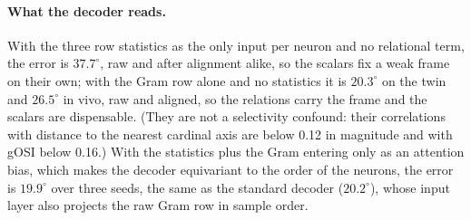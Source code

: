 \documentclass[11pt]{article}
\begin{document}
\paragraph{What the decoder reads.} With the three row statistics as the only input per neuron and no relational term, the error is $37.7^\circ$, raw and after alignment alike, so the scalars fix a weak frame on their own; with the Gram row alone and no statistics it is $20.3^\circ$ on the twin and $26.5^\circ$ in vivo, raw and aligned, so the relations carry the frame and the scalars are dispensable. (They are not a selectivity confound: their correlations with distance to the nearest cardinal axis are below 0.12 in magnitude and with gOSI below 0.16.) With the statistics plus the Gram entering only as an attention bias, which makes the decoder equivariant to the order of the neurons, the error is $19.9^\circ$ over three seeds, the same as the standard decoder ($20.2^\circ$), whose input layer also projects the raw Gram row in sample order.
\end{document}
